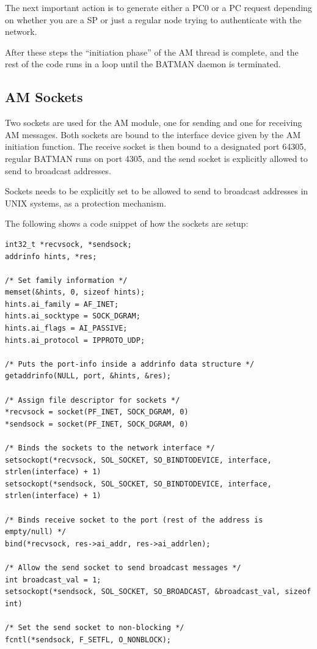 The next important action is to generate either a \ac{PC0} or a \ac{PC} request
depending on whether you are a \ac{SP} or just a regular node trying to
authenticate with the network.

After these steps the ``initiation phase'' of the AM thread is complete, and the
rest of the code runs in a loop until the BATMAN daemon is terminated.

\subsection{AM Sockets}\label{subsect:am_socks}
Two sockets are used for the AM module, one for sending and one for receiving AM
messages. Both sockets are bound to the interface device given by the AM
initiation function. The receive socket is then bound to a designated port
64305, regular BATMAN runs on port 4305, and the send socket is explicitly
allowed to send to broadcast addresses.

Sockets needs to be explicitly set to be allowed to send to broadcast addresses
in UNIX systems, as a protection mechanism.

The following shows a code snippet of how the sockets are setup:
\begin{lstlisting}[frame=tb]
int32_t *recvsock, *sendsock;
addrinfo hints, *res;

/* Set family information */
memset(&hints, 0, sizeof hints);
hints.ai_family = AF_INET;
hints.ai_socktype = SOCK_DGRAM;
hints.ai_flags = AI_PASSIVE;
hints.ai_protocol = IPPROTO_UDP;

/* Puts the port-info inside a addrinfo data structure */
getaddrinfo(NULL, port, &hints, &res);

/* Assign file descriptor for sockets */
*recvsock = socket(PF_INET, SOCK_DGRAM, 0)
*sendsock = socket(PF_INET, SOCK_DGRAM, 0)

/* Binds the sockets to the network interface */
setsockopt(*recvsock, SOL_SOCKET, SO_BINDTODEVICE, interface, strlen(interface) + 1)
setsockopt(*sendsock, SOL_SOCKET, SO_BINDTODEVICE, interface, strlen(interface) + 1)

/* Binds receive socket to the port (rest of the address is empty/null) */
bind(*recvsock, res->ai_addr, res->ai_addrlen);

/* Allow the send socket to send broadcast messages */
int broadcast_val = 1;
setsockopt(*sendsock, SOL_SOCKET, SO_BROADCAST, &broadcast_val, sizeof int)

/* Set the send socket to non-blocking */
fcntl(*sendsock, F_SETFL, O_NONBLOCK);

\end{lstlisting}

